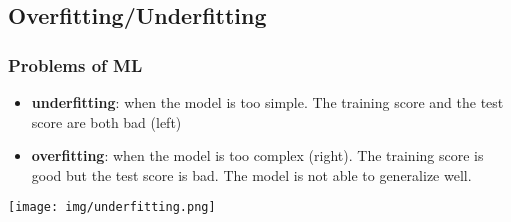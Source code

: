 \documentclass{beamer}
\begin{document}
\subsection{Overfitting/Underfitting}
\begin{frame}
  \frametitle{Problems of ML}
  \begin{itemize}
    \item \textbf{underfitting}: when the model is too simple. The training
    score and the test score are both bad (left)
    \item \textbf{overfitting}: when the model is too complex (right). The
    training score is good but the test score is bad. The model is not able to
    generalize well.
  \end{itemize}
  \begin{center}
    \texttt{[image: img/underfitting.png]}
  \end{center}
\end{frame}
\end{document}
